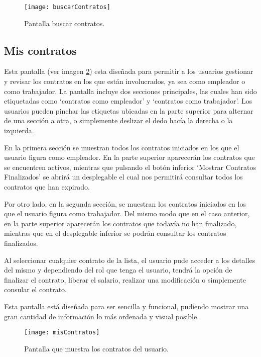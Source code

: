 \begin{figure}[h]
	\centering
	\texttt{[image: buscarContratos]}
	\caption[Pantalla buscar contratos]{Pantalla buscar contratos.}
	\label{fig:buscarContratos}
\end{figure}



\subsection{Mis contratos}

Esta pantalla (ver imagen \ref{fig:misContratos}) esta diseñada para permitir a los usuarios gestionar y revisar los contratos en los que están involucrados, ya sea como empleador o como trabajador.
La pantalla incluye dos secciones principales, las cuales han sido etiquetadas como `contratos como empleador' y `contratos como trabajador'. Los usuarios pueden pinchar las etiquetas ubicadas en la parte superior para alternar de una sección a otra, o simplemente deslizar el dedo hacía la derecha o la izquierda.

En la primera sección se muestran todos los contratos iniciados en los que el usuario figura como empleador. En la parte superior aparecerán los contratos que se encuentren activos, mientras que pulsando el botón inferior `Mostrar Contratos Finalizados' se abrirá un desplegable el cual nos permitirá consultar todos los contratos que han expirado.

Por otro lado, en la segunda sección, se muestran los contratos iniciados en los que el usuario figura como trabajador. Del mismo modo que en el caso anterior, en la parte superior aparecerán los contratos que todavía no han finalizado, mientras que en el desplegable inferior se podrán consultar los contratos finalizados.

Al seleccionar cualquier contrato de la lista, el usuario pude acceder a los detalles del mismo y dependiendo del rol que tenga el usuario, tendrá la opción de finalizar el contrato, liberar el salario, realizar una modificación o simplemente consular el contrato.

Esta pantalla está diseñada para ser sencilla y funcional, pudiendo mostrar una gran cantidad de información lo más ordenada y visual posible.

\begin{figure}[h]
	\label{fig:misContratos}
	\centering
	\texttt{[image: misContratos]}
	\caption[Pantalla contratos del usuario]{Pantalla que muestra los contratos del usuario.}
	\label{fig:misContratos}
\end{figure}


